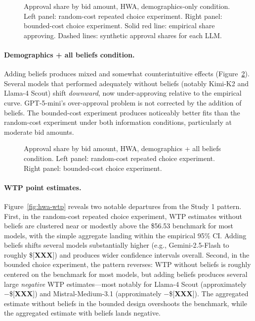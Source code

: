 \documentclass[12pt]{article}
\begin{document}
\begin{figure}[h]
    \centering
    \caption{Approval share by bid amount, HWA, demographics-only condition. Left panel: random-cost repeated choice experiment. Right panel: bounded-cost choice experiment. Solid red line: empirical share approving. Dashed lines: synthetic approval shares for each LLM.}
    \label{fig:hwa-demo-only}
\end{figure}

\paragraph{Demographics + all beliefs condition.} Adding beliefs produces mixed and somewhat counterintuitive effects (Figure~\ref{fig:hwa-all-beliefs}). Several models that performed adequately without beliefs (notably Kimi-K2 and Llama-4 Scout) shift \emph{downward}, now under-approving relative to the empirical curve. GPT-5-mini's over-approval problem is not corrected by the addition of beliefs. The bounded-cost experiment produces noticeably better fits than the random-cost experiment under both information conditions, particularly at moderate bid amounts.

\begin{figure}[h]
    \centering
    \caption{Approval share by bid amount, HWA, demographics + all beliefs condition. Left panel: random-cost repeated choice experiment. Right panel: bounded-cost choice experiment.}
    \label{fig:hwa-all-beliefs}
\end{figure}

\paragraph{WTP point estimates.} Figure~\ref{fig:hwa-wtp} reveals two notable departures from the Study 1 pattern. First, in the random-cost repeated choice experiment, WTP estimates without beliefs are clustered near or modestly above the \$56.53 benchmark for most models, with the simple aggregate landing within the empirical 95\% CI. Adding beliefs shifts several models substantially higher (e.g., Gemini-2.5-Flash to roughly \$[\textbf{XXX}]) and produces wider confidence intervals overall. Second, in the bounded choice experiment, the pattern reverses: WTP without beliefs is roughly centered on the benchmark for most models, but adding beliefs produces several large \emph{negative} WTP estimates---most notably for Llama-4 Scout (approximately $-$\$[\textbf{XXX}]) and Mistral-Medium-3.1 (approximately $-$\$[\textbf{XXX}]). The aggregated estimate without beliefs in the bounded design overshoots the benchmark, while the aggregated estimate with beliefs lands negative.
\end{document}
